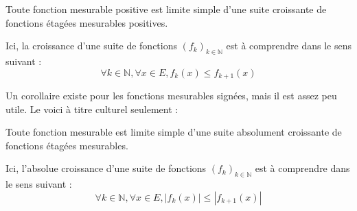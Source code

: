 \documentclass[../integ-proba.tex]{subfiles}
\begin{document}
  \begin{thm}
    \label{thm:decompmes}
    Toute fonction mesurable positive est limite simple d'une suite croissante de fonctions étagées mesurables positives.
  \end{thm}

  \begin{rem}
    Ici, la croissance d'une suite de fonctions $\left(f_k\right)_{k\in \mathbb{N}}$ est à comprendre dans le sens suivant :
    $$
    \forall k \in \mathbb{N}, \forall x \in E, f_k(x) \leq f_{k+1}(x)
    $$
  \end{rem}

  Un corollaire existe pour les fonctions mesurables signées, mais il est assez peu utile. Le voici à titre culturel seulement :

  \begin{cor}
    Toute fonction mesurable est limite simple d'une suite absolument croissante de fonctions étagées mesurables.
  \end{cor}

  \begin{rem}
    Ici, l'absolue croissance d'une suite de fonctions $\left(f_k\right)_{k\in \mathbb{N}}$ est à comprendre dans le sens suivant :
    $$
    \forall k \in \mathbb{N}, \forall x \in E, \left|f_k(x)\right| \leq \left|f_{k+1}(x)\right|
    $$
  \end{rem}
\end{document}
